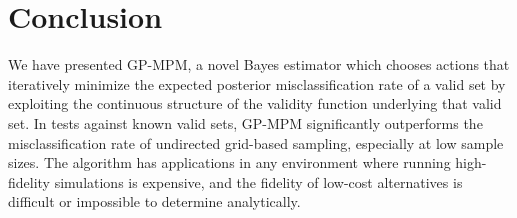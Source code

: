\documentclass[letterpaper, 10 pt, conference]{ieeeconf}  %
\begin{document}

\section{Conclusion}

We have presented GP-MPM, a novel Bayes estimator which chooses actions that iteratively minimize the expected posterior misclassification rate of a valid set by exploiting the continuous structure of the validity function underlying that valid set. In tests against known valid sets, GP-MPM significantly outperforms the misclassification rate of undirected grid-based sampling, especially at low sample sizes. The algorithm has applications in any environment where running high-fidelity simulations is expensive, and the fidelity of low-cost alternatives is difficult or impossible to determine analytically.
\end{document}
